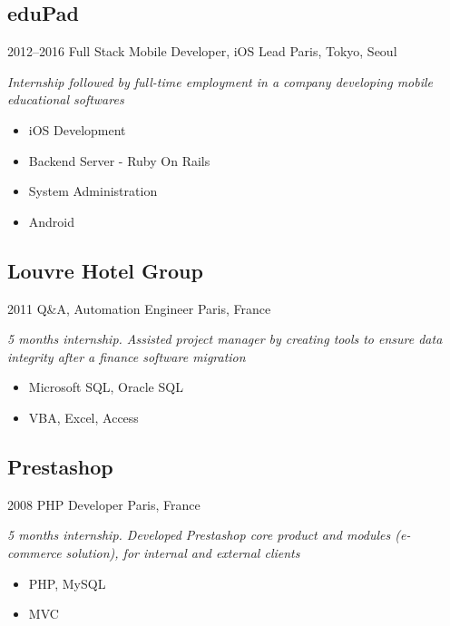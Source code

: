 \documentclass[]{template/friggeri-cv} %
\begin{document}
\subsection{eduPad}
\begin{entrylist}


\entry
{2012--2016}
{Full Stack Mobile Developer, iOS Lead}
{Paris, Tokyo, Seoul}
{\emph{Internship followed by full-time employment in a company developing mobile educational softwares}
\begin{itemize}
\item{iOS Development} 
\item{Backend Server - Ruby On Rails} 
\item{System Administration} 
\item{Android} 
\end{itemize}
}

\end{entrylist}



\subsection{Louvre Hotel Group}
\begin{entrylist}
\entry
{2011}
{Q\&A, Automation Engineer}
{Paris, France}
{\emph{5 months internship. Assisted project manager by creating tools to ensure data integrity after a finance software migration}\\

\begin{itemize}
\item {Microsoft SQL, Oracle SQL}
\item {VBA, Excel, Access}

\end{itemize}
}
\end{entrylist}

\goodbreak
\subsection{Prestashop}
\begin{entrylist}
\entry
{2008}
{PHP Developer}
{Paris, France}
{\emph{5 months internship. Developed Prestashop core product and modules (e-commerce solution), for internal and external clients}

\begin{itemize}

\item {PHP, MySQL}
\item {MVC}

\end{itemize}
}
\end{entrylist}
\end{document}
